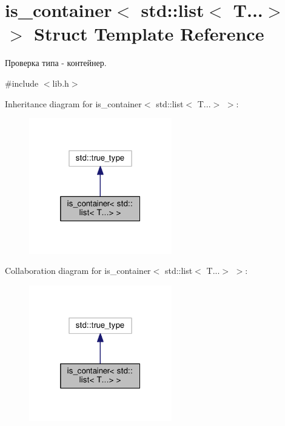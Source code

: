 \hypertarget{structis__container_3_01std_1_1list_3_01T_8_8_8_4_01_4}{\section{is\-\_\-container$<$ std\-:\-:list$<$ T...$>$ $>$ Struct Template Reference}
\label{structis__container_3_01std_1_1list_3_01T_8_8_8_4_01_4}
}


Проверка типа -\/ контейнер.  




{\ttfamily \#include $<$lib.\-h$>$}



Inheritance diagram for is\-\_\-container$<$ std\-:\-:list$<$ T...$>$ $>$\-:
\nopagebreak
\begin{figure}[H]
\begin{center}
\leavevmode
\includegraphics[width=176pt]{structis__container_3_01std_1_1list_3_01T_8_8_8_4_01_4__inherit__graph}
\end{center}
\end{figure}


Collaboration diagram for is\-\_\-container$<$ std\-:\-:list$<$ T...$>$ $>$\-:
\nopagebreak
\begin{figure}[H]
\begin{center}
\leavevmode
\includegraphics[width=176pt]{structis__container_3_01std_1_1list_3_01T_8_8_8_4_01_4__coll__graph}
\end{center}
\end{figure}


